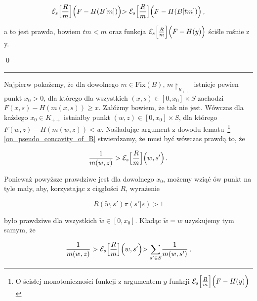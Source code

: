 \begin{equation}
\mathcal{E}_s \Bigl[ \frac{R}{m}\Bigl]	\Bigl( F - H(B[m])\Bigl)  > \mathcal{E}_s \Bigl[ \frac{R}{m}\Bigl]	\Bigl( F - H(B[tm])\Bigl)\,,
\end{equation}
	
	a to jest prawda, bowiem $tm < m$ oraz funkcja $\mathcal{E}_s \Bigl[ \frac{R}{m}\Bigl]	\Bigl( F - H(y)\Bigl)$ ściśle rośnie z y.	
	



\qed
\newline


\hrule
\begin{dowod}\label{proof_x0_monotonicity_of_B}
\end{dowod}

	Najpierw pokażemy, że dla dowolnego $m\in \mathrm{Fix}(B)$, $m\restriction_{K_{++}}$ istnieje pewien punkt $x_0 >0$, dla którego dla wszystkich $(x,s) \in [0, x_0]\times S$ zachodzi $F(x,s)- H(m(x,s)) \geq x$. 
	Załóżmy bowiem, że tak nie jest. Wówczas dla każdego $x_0 \in K_{++}$ istniałby punkt $(w,z) \in [0, x_0] \times S$, dla którego $F(w,z)-H(m(w,z)) < w$. Naśladując argument z dowodu lematu~\footnote{O ścisłej monotoniczności funkcji z argumentem $y$ funkcji $\mathcal{E}_s \Bigl[ \frac{R}{m}\Bigl]	\Bigl( F - H(y)\Bigl)$} \ref{on_pseudo_concavity_of_B} stwierdzamy, że musi być wówczas prawdą to, że 
	
\begin{equation*}
	\frac{1}{m(w,z)} > \mathcal{E}_s \Bigl[\frac{R}{m} \Bigl]\Bigl( w, s'\Bigl)\,.
\end{equation*}	
	
Ponieważ powyższe prawdziwe jest dla dowolnego $x_0$, możemy wziąć ów punkt na tyle mały, aby, korzystając z ciągłości $R$, wyrażenie 

\begin{equation*}
	R(\tilde{w}, s')\pi(s'|s) > 1
\end{equation*}

było prawdziwe dla wszystkich $\tilde{w} \in [0,x_0]$. Kładąc $\tilde{w} = w$ uzyskujemy tym samym, że 

\begin{equation*}
	\frac{1}{m(w,z)} > \mathcal{E}_s \Bigl[\frac{R}{m} \Bigl]\Bigl( w, s'\Bigl) > \underset{s' \in S}{\sum} \frac{1}{m(w,s')}\,,
\end{equation*} 
	
